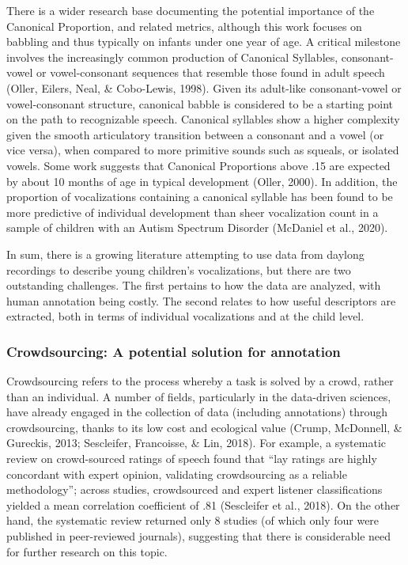 \documentclass[english,,man,floatsintext]{apa6}
\begin{document}
There is a wider research base documenting the potential importance of the Canonical Proportion, and related metrics, although this work focuses on babbling and thus typically on infants under one year of age. A critical milestone involves the increasingly common production of Canonical Syllables, consonant-vowel or vowel-consonant sequences that resemble those found in adult speech (Oller, Eilers, Neal, \& Cobo-Lewis, 1998). Given its adult-like consonant-vowel or vowel-consonant structure, canonical babble is considered to be a starting point on the path to recognizable speech. Canonical syllables show a higher complexity given the smooth articulatory transition between a consonant and a vowel (or vice versa), when compared to more primitive sounds such as squeals, or isolated vowels. Some work suggests that Canonical Proportions above .15 are expected by about 10 months of age in typical development (Oller, 2000). In addition, the proportion of vocalizations containing a canonical syllable has been found to be more predictive of individual development than sheer vocalization count in a sample of children with an Autism Spectrum Disorder (McDaniel et al., 2020).

In sum, there is a growing literature attempting to use data from daylong recordings to describe young children's vocalizations, but there are two outstanding challenges. The first pertains to how the data are analyzed, with human annotation being costly. The second relates to how useful descriptors are extracted, both in terms of individual vocalizations and at the child level.

\hypertarget{crowdsourcing-a-potential-solution-for-annotation}{%
\subsubsection{Crowdsourcing: A potential solution for annotation}\label{crowdsourcing-a-potential-solution-for-annotation}}

Crowdsourcing refers to the process whereby a task is solved by a crowd, rather than an individual. A number of fields, particularly in the data-driven sciences, have already engaged in the collection of data (including annotations) through crowdsourcing, thanks to its low cost and ecological value (Crump, McDonnell, \& Gureckis, 2013; Sescleifer, Francoisse, \& Lin, 2018). For example, a systematic review on crowd-sourced ratings of speech found that \enquote{lay ratings are highly concordant with expert opinion, validating crowdsourcing as a reliable methodology}; across studies, crowdsourced and expert listener classifications yielded a mean correlation coefficient of .81 (Sescleifer et al., 2018). On the other hand, the systematic review returned only 8 studies (of which only four were published in peer-reviewed journals), suggesting that there is considerable need for further research on this topic.
\end{document}

